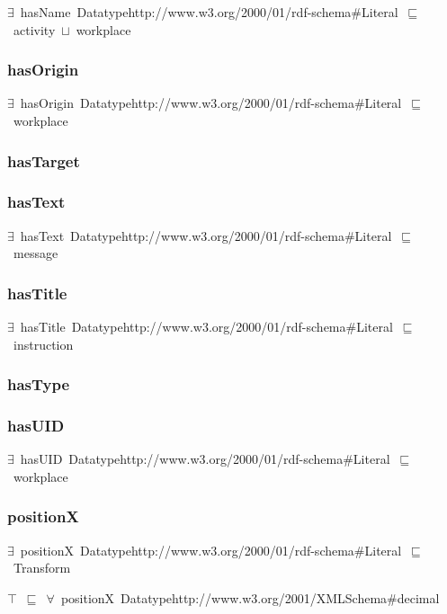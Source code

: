 \documentclass{article}
\begin{document}
\ensuremath{\exists}~hasName~Datatypehttp://www.w3.org/2000/01/rdf-schema#Literal~\ensuremath{\sqsubseteq}~activity~\ensuremath{\sqcup}~workplace

\subsubsection*{hasOrigin}

\ensuremath{\exists}~hasOrigin~Datatypehttp://www.w3.org/2000/01/rdf-schema#Literal~\ensuremath{\sqsubseteq}~workplace

\subsubsection*{hasTarget}

\subsubsection*{hasText}

\ensuremath{\exists}~hasText~Datatypehttp://www.w3.org/2000/01/rdf-schema#Literal~\ensuremath{\sqsubseteq}~message

\subsubsection*{hasTitle}

\ensuremath{\exists}~hasTitle~Datatypehttp://www.w3.org/2000/01/rdf-schema#Literal~\ensuremath{\sqsubseteq}~instruction

\subsubsection*{hasType}

\subsubsection*{hasUID}

\ensuremath{\exists}~hasUID~Datatypehttp://www.w3.org/2000/01/rdf-schema#Literal~\ensuremath{\sqsubseteq}~workplace

\subsubsection*{positionX}

\ensuremath{\exists}~positionX~Datatypehttp://www.w3.org/2000/01/rdf-schema#Literal~\ensuremath{\sqsubseteq}~Transform

\ensuremath{\top}~\ensuremath{\sqsubseteq}~\ensuremath{\forall}~positionX~Datatypehttp://www.w3.org/2001/XMLSchema#decimal
\end{document}
